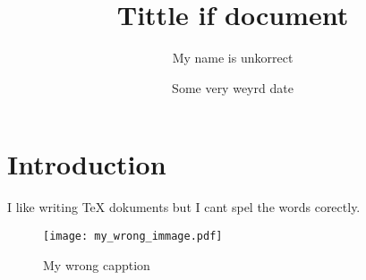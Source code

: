\documentclass{article}
\title{Tittle if document}
\author{My name is unkorrect}
\date{Some very weyrd date}
\begin{document}
\maketitle

\section{Introduction}

I like writing TeX dokuments but I cant spel the words corectly.


\begin{figure}
    \centering
    \texttt{[image: my\_wrong\_immage.pdf]} %
    \caption{My wrong capption} %
    \label{fig:my_wrong_labell} %
\end{figure}
\end{document}
